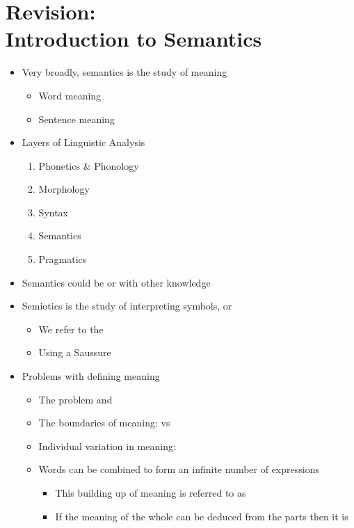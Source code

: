 \documentclass[headrule,footrule]{foils}
\begin{document}
\section{Revision: \\ Introduction to Semantics}

\begin{itemize}
\item Very broadly, semantics is the study of meaning
  \begin{itemize}
  \item Word meaning
  \item Sentence meaning
  \end{itemize}
\item Layers of Linguistic Analysis
  \begin{enumerate}%
  \item Phonetics \& Phonology
  \item Morphology
  \item Syntax
  \item Semantics
  \item Pragmatics
  \end{enumerate}
\item Semantics could be  or  with other knowledge
\end{itemize}


\begin{itemize}
\item Semiotics is the study of interpreting symbols, or 
  \begin{itemize}
  \item We refer to the 
  \item Using a \hfill Saussure
  \end{itemize}
\item Problems with defining meaning
  \begin{itemize}
  \item The  problem and 
  \item The boundaries of meaning:  vs 
  \item Individual variation in meaning: 
  \item Words can be combined to form an infinite number of expressions
    \begin{itemize}
    \item This building up of meaning is referred to as 
    \item If the meaning of the whole can be deduced from the parts then it is 
  \end{itemize}
\end{itemize}
\end{itemize}
\end{document}
